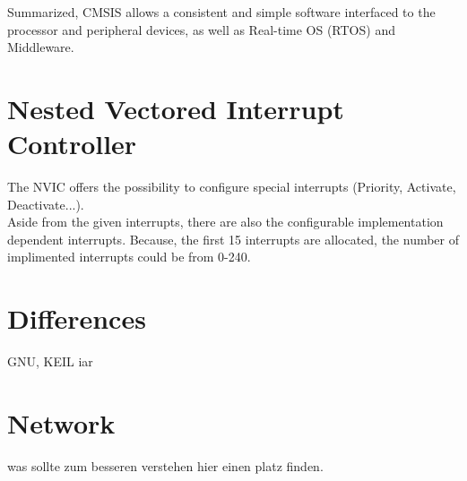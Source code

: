 Summarized, CMSIS allows a consistent and simple software interfaced to the processor 
and peripheral devices, as well as Real-time OS (RTOS) and Middleware.

\section{Nested Vectored Interrupt Controller}
The NVIC offers the possibility to configure special interrupts 
(Priority, Activate, Deactivate...). \\
Aside from the given interrupts, there are also the configurable implementation dependent interrupts.  
Because, the first 15 interrupts are allocated, the number of implimented interrupts could be from 0-240.

\section{Differences }
GNU, KEIL iar

\section{Network}
was sollte zum besseren verstehen hier einen platz finden.
